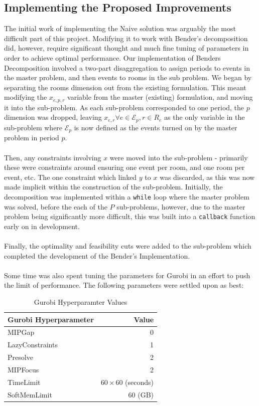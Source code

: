 \documentclass{article}
\newcommand{\E}{\mathcal{E}}
\newcommand{\inlinecode}[1]{\colorbox{gray!20}{\texttt{#1}}}
\begin{document}
\subsection{Implementing the Proposed Improvements}
The initial work of implementing the Naive solution was arguably the most difficult part of this project. Modifying it to work with Bender's decomposition did, however, require significant thought and much fine tuning of parameters in order to achieve optimal performance. Our implementation of Benders Decomposition involved a two-part disaggregation to assign periods to events in the master problem, and then events to rooms in the sub problem. We began by separating the rooms dimension out from the existing formulation. This meant modifying the $x_{e, p, r}$ variable from the master (existing) formulation, and moving it into the sub-problem. As each sub-problem corresponded to one period, the $p$ dimension was dropped, leaving $x_{e, r} \forall e \in \E_p, r \in R_e$ as the only variable in the sub-problem where $\E_p$ is now defined as the events turned on by the master problem in period $p$. \\
\\
Then, any constraints involving $x$ were moved into the sub-problem - primarily these were constraints around ensuring one event per room, and one room per event, etc. The one constraint which linked $y$ to $x$ was discarded, as this was now made implicit within the construction of the sub-problem. Initially, the decomposition was implemented within a \inlinecode{while} loop where the master problem was solved, before the each of the $P$ sub-problems, however, due to the master problem being significantly more difficult, this was built into a \texttt{callback} function early on in development. \\
\\
Finally, the optimality and feasibility cuts were added to the sub-problem which completed the development of the Bender's Implementation. \\
\\
Some time was also spent tuning the parameters for Gurobi in an effort to push the limit of performance. The following parameters were settled upon as best:

\begin{table}[htb]
    \centering
    \begin{tabular}{|l|r|}
        \hline
        \textbf{Gurobi Hyperparameter} & \textbf{Value} \\
        \hline
        MIPGap & 0 \\
        LazyConstraints & 1 \\
        Presolve & 2 \\
        MIPFocus & 2 \\
        TimeLimit & $60 \times 60$ (seconds) \\
        SoftMemLimit & 60 (GB) \\
        \hline
    \end{tabular}
    \caption{Gurobi Hyperparamter Values}
    \label{tab:gurobi_param_values}
\end{table}
\end{document}

